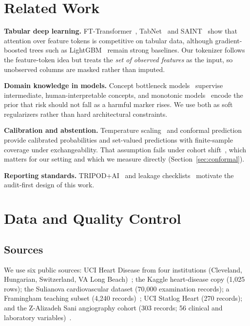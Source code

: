 \documentclass[journal]{IEEEtran}
\begin{document}
\section{Related Work}\label{sec:related}
\textbf{Tabular deep learning.} FT-Transformer~\cite{gorishniy2021}, TabNet~\cite{arik2021} and SAINT~\cite{somepalli2021} show that attention over feature tokens is competitive on tabular data, although gradient-boosted trees such as LightGBM~\cite{ke2017} remain strong baselines. Our tokenizer follows the feature-token idea but treats the \emph{set of observed features} as the input, so unobserved columns are masked rather than imputed.

\textbf{Domain knowledge in models.} Concept bottleneck models~\cite{koh2020} supervise intermediate, human-interpretable concepts, and monotonic models~\cite{gupta2016} encode the prior that risk should not fall as a harmful marker rises. We use both as soft regularizers rather than hard architectural constraints.

\textbf{Calibration and abstention.} Temperature scaling~\cite{guo2017} and conformal prediction~\cite{vovk2005,angelopoulos2023} provide calibrated probabilities and set-valued predictions with finite-sample coverage under exchangeability. That assumption fails under cohort shift~\cite{tibshirani2019,barber2023}, which matters for our setting and which we measure directly (Section~\ref{sec:conformal}).

\textbf{Reporting standards.} TRIPOD+AI~\cite{collins2024} and leakage checklists~\cite{kapoor2023} motivate the audit-first design of this work.

\section{Data and Quality Control}\label{sec:data}
\subsection{Sources}
We use six public sources: UCI Heart Disease from four institutions (Cleveland, Hungarian, Switzerland, VA Long Beach)~\cite{dua2019,detrano1989}; the Kaggle heart-disease copy (1{,}025 rows); the Sulianova cardiovascular dataset (70{,}000 examination records); a Framingham teaching subset (4{,}240 records)~\cite{dawber1951}; UCI Statlog Heart (270 records); and the Z-Alizadeh Sani angiography cohort (303 records; 56 clinical and laboratory variables)~\cite{alizadehsani2013}.
\end{document}

